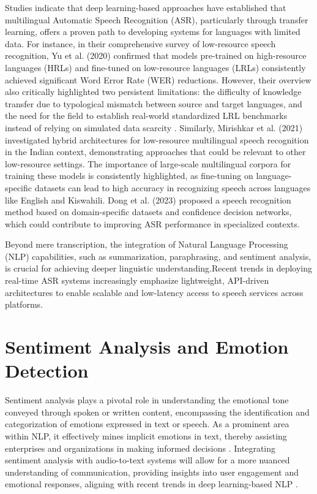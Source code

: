 \noindent Studies indicate that deep learning-based approaches have established that multilingual Automatic Speech Recognition (ASR), particularly through transfer learning, offers a proven path to developing systems for languages with limited data. For instance, in their comprehensive survey of low-resource speech recognition, Yu et al. (2020) confirmed that models pre-trained on high-resource languages (HRLs) and fine-tuned on low-resource languages (LRLs) consistently achieved significant Word Error Rate (WER) reductions. However, their overview also critically highlighted two persistent limitations: the difficulty of knowledge transfer due to typological mismatch between source and target languages, and the need for the field to establish real-world standardized LRL benchmarks instead of relying on simulated data scarcity \cite{9180290}. Similarly, Mirishkar et al. (2021) investigated hybrid architectures for low-resource multilingual speech recognition in the Indian context, demonstrating approaches that could be relevant to other low-resource settings. The importance of large-scale multilingual corpora for training these models is consistently highlighted, as fine-tuning on language-specific datasets can lead to high accuracy in recognizing speech across languages like English and Kiswahili. Dong et al. (2023) proposed a speech recognition method based on domain-specific datasets and confidence decision networks, which could contribute to improving ASR performance in specialized contexts.

\noindent Beyond mere transcription, the integration of Natural Language Processing (NLP) capabilities, such as summarization, paraphrasing, and sentiment analysis, is crucial for achieving deeper linguistic understanding.Recent trends in deploying real-time ASR systems increasingly emphasize lightweight, API-driven architectures to enable scalable and low-latency access to speech services across platforms.


\section{Sentiment Analysis and Emotion Detection}
Sentiment analysis plays a pivotal role in understanding the emotional tone conveyed through spoken or written content, encompassing the identification and categorization of emotions expressed in text or speech. As a prominent area within NLP, it effectively mines implicit emotions in text, thereby assisting enterprises and organizations in making informed decisions \cite{RahmanJim2024}. Integrating sentiment analysis with audio-to-text systems will allow for a more nuanced understanding of communication, providing insights into user engagement and emotional responses, aligning with recent trends in deep learning-based NLP \cite{Sajid2023}.

